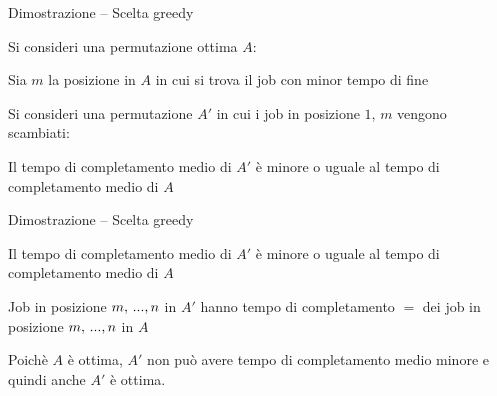 \begin{frame}{Dimostrazione -- Scelta greedy}

\vspace{-9pt}
\begin{myboxtitle}
\BIL
\item Si consideri una permutazione ottima $A$:

\medskip
{}

\item Sia \alert{$m$} la posizione in $A$  in cui si trova il job con \alert{minor tempo di fine}
\item Si consideri una permutazione $A'$ in cui i job in posizione $1$, $m$ vengono
scambiati: 

\medskip
{}

\item Il tempo di completamento medio di $A'$ è minore o uguale al tempo di completamento medio di $A$
\EIL
\end{myboxtitle}
\end{frame}

\begin{frame}{Dimostrazione -- Scelta greedy}

\vspace{-9pt}
\begin{myboxtitle}
\BIL

\item Il tempo di completamento medio di $A'$ è minore o uguale al tempo
di completamento medio di $A$
\medskip
{}

  \BIL
	\item \color{red}{Job in posizione $1, \mydots, m-1$ in $A'$ hanno tempo di completamento $\leq$ dei job in posizione $1, \mydots, m-1$ in $A$}
	\item \color{blue}Job in posizione $m, \mydots, n$ in $A'$ hanno tempo di completamento $=$ dei job in posizione $m, \mydots, n$ in $A$
  \EIL
\item Poichè $A$ è ottima, $A'$ non può avere tempo di completamento medio minore e quindi anche $A'$ è ottima.
\EIL
\end{myboxtitle}
\end{frame}



